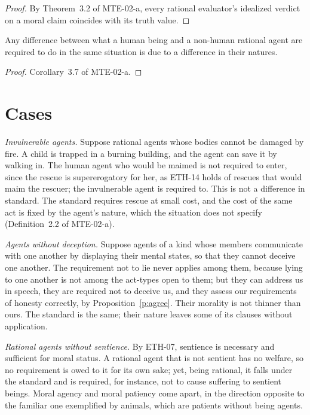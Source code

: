 \documentclass{situationist-preprint}
\begin{document}
\begin{proof}
By Theorem~3.2 of MTE-02-a, every rational evaluator's idealized verdict on a moral claim coincides with its truth value.
\end{proof}

\begin{corollary}\label{c:var}
Any difference between what a human being and a non-human rational agent are required to do in the same situation is due to a difference in their natures.
\end{corollary}

\begin{proof}
Corollary~3.7 of MTE-02-a.
\end{proof}

\section{Cases}\label{s:cases}

\emph{Invulnerable agents.} Suppose rational agents whose bodies cannot be damaged by fire. A child is trapped in a burning building, and the agent can save it by walking in. The human agent who would be maimed is not required to enter, since the rescue is supererogatory for her, as ETH-14 holds of rescues that would maim the rescuer; the invulnerable agent is required to. This is not a difference in standard. The standard requires rescue at small cost, and the cost of the same act is fixed by the agent's nature, which the situation does not specify (Definition~2.2 of MTE-02-a).

\emph{Agents without deception.} Suppose agents of a kind whose members communicate with one another by displaying their mental states, so that they cannot deceive one another. The requirement not to lie never applies among them, because lying to one another is not among the act-types open to them; but they can address us in speech, they are required not to deceive us, and they assess our requirements of honesty correctly, by Proposition~\ref{p:agree}. Their morality is not thinner than ours. The standard is the same; their nature leaves some of its clauses without application.

\emph{Rational agents without sentience.} By ETH-07, sentience is necessary and sufficient for moral status. A rational agent that is not sentient has no welfare, so no requirement is owed to it for its own sake; yet, being rational, it falls under the standard and is required, for instance, not to cause suffering to sentient beings. Moral agency and moral patiency come apart, in the direction opposite to the familiar one exemplified by animals, which are patients without being agents.
\end{document}
